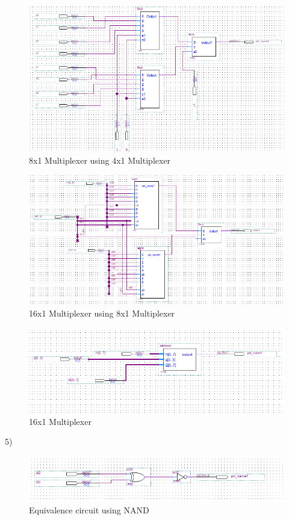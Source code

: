 \documentclass[11pt]{report}
\begin{document}
\begin{figure}[H]
  \includegraphics[width=\linewidth]{4x1}
  \caption{8x1 Multiplexer using 4x1 Multiplexer}
  \label{fig:zero}
\end{figure} 

\begin{figure}[H]
  \includegraphics[width=\linewidth]{8x1}
  \caption{16x1 Multiplexer using 8x1 Multiplexer}
  \label{fig:zero}
\end{figure} 

\begin{figure}[H]
  \includegraphics[width=\linewidth]{16x1}
  \caption{16x1 Multiplexer}
  \label{fig:zero}
\end{figure} 
5)
\begin{figure}[H]
  \includegraphics[width=\linewidth]{equal}
  \caption{Equivalence circuit using NAND}
  \label{fig:zero}
\end{figure} 
\end{document}
